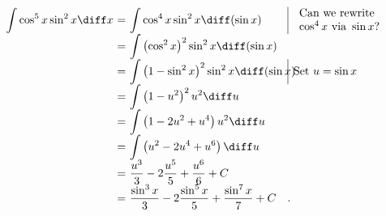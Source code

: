 \begin{frame}
\begin{example}
$
\begin{array}{r@{~}c@{~}@{}l@{}l@{\!\!\!\!}|l}
\displaystyle\int \cos^5 x \sin^2 x \diff x&=&\displaystyle \int \cos^4 x \sin^2x \diff (\sin x)&&\begin{array}{l}\text{Can we }
\text{rewrite}\\\cos^4 x \text{ via } \sin x\text{?} \end{array}\\
&=&\displaystyle\int \left(\cos^2 x\right)^2\sin^2x\diff (\sin x)\\
&=&\displaystyle\int \left(1-\sin^2 x\right)^2\sin^2x\diff (\sin x) && \text{Set } u=\sin x\\
&=&\displaystyle\int \left(1-u^2\right)^2u^2\diff u\\
&=&\displaystyle\int \left( 1-2u^2+u^4  \right)u^2\diff u\\
&=&\displaystyle\int \left( u^2-2u^4+u^6  \right)\diff u\\
&=&\displaystyle \frac{u^3}{3}-2\frac{u^5}{5}+\frac{u^6}{6}+C\\
&=&\displaystyle \frac{\sin^3 x}{3}-2\frac{\sin^5x}{5}+\frac{\sin^7 x}{7}+C\quad .

\end{array}
$
\end{example}
\end{frame}
